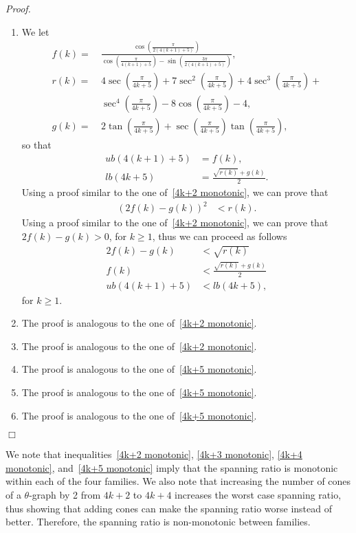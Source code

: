 \documentclass[12pt]{article}
\newenvironment{proof}{\emph{Proof.}}{\hfill $\Box$\\}
\begin{document}
\begin{proof}
\begin{enumerate}
\item We let
\begin{align*}
f(k) =~ & \frac{\cos\left(\frac{\pi}{2(4(k+1)+5)}\right)}{\cos\left(\frac{\pi}{4(k+1)+5}\right)-\sin\left(\frac{3\pi}{2(4(k+1)+5)}\right)} ,\\
r(k) =~ & 4\sec\left(\frac{\pi}{4k+5}\right) + 7\sec^2\left(\frac{\pi}{4k+5}\right) + 4\sec^3\left(\frac{\pi}{4k+5}\right) + \\ 
& \sec^4\left(\frac{\pi}{4k+5}\right) - 8\cos\left(\frac{\pi}{4k+5}\right) - 4,\\
g(k) =~ & 2\tan\left(\frac{\pi}{4k+5}\right)+\sec\left(\frac{\pi}{4k+5}\right)\tan\left(\frac{\pi}{4k+5}\right),
\end{align*}
so that
\begin{align*}
ub(4(k+1)+5) &= f(k), \\
lb(4k+5) &= \frac{\sqrt{r(k)}+g(k)}{2}.
\end{align*}
Using a proof similar to the one of~\eqref{4k+2 monotonic}, we can prove that
\begin{align*}
(2f(k)-g(k))^2 &< r(k). 
\end{align*}
Using a proof similar to the one of~\eqref{4k+2 monotonic}, we can prove that $2f(k)-g(k) > 0$, for $k \geq 1$, thus we can proceed as follows
\begin{align*}
2f(k)-g(k) &< \sqrt{r(k)} \\
f(k) &< \frac{\sqrt{r(k)}+g(k)}{2} \\
ub(4(k+1)+5) &< lb(4k+5), 
\end{align*}
for $k \geq 1$.

\item The proof is analogous to the one of~\eqref{4k+2 monotonic}.

\item The proof is analogous to the one of~\eqref{4k+2 monotonic}.

\item The proof is analogous to the one of~\eqref{4k+5 monotonic}.

\item The proof is analogous to the one of~\eqref{4k+5 monotonic}.

\item The proof is analogous to the one of~\eqref{4k+5 monotonic}.
\end{enumerate}
\vspace{-1.5em}
\end{proof}

We note that inequalities~\eqref{4k+2 monotonic}, \eqref{4k+3 monotonic}, \eqref{4k+4 monotonic}, and~\eqref{4k+5 monotonic} imply that the spanning ratio is monotonic within each of the four families. We also note that increasing the number of cones of a $\theta$-graph by 2 from $4k + 2$ to $4k + 4$ increases the worst case spanning ratio, thus showing that adding cones can make the spanning ratio worse instead of better. Therefore, the spanning ratio is non-monotonic between families. 
\end{document}
